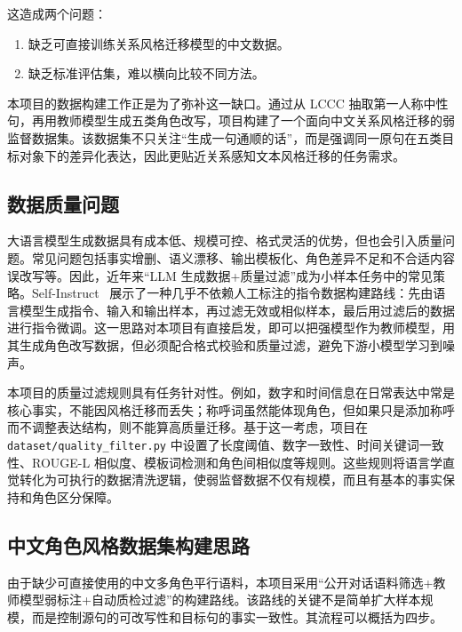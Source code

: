 \documentclass[12pt,a4paper]{ctexart}
\begin{document}
这造成两个问题：

\begin{enumerate}[leftmargin=2em]
  \item 缺乏可直接训练关系风格迁移模型的中文数据。
  \item 缺乏标准评估集，难以横向比较不同方法。
\end{enumerate}

本项目的数据构建工作正是为了弥补这一缺口。通过从 LCCC 抽取第一人称中性句，再用教师模型生成五类角色改写，项目构建了一个面向中文关系风格迁移的弱监督数据集。该数据集不只关注“生成一句通顺的话”，而是强调同一原句在五类目标对象下的差异化表达，因此更贴近关系感知文本风格迁移的任务需求。

\subsection{数据质量问题}

大语言模型生成数据具有成本低、规模可控、格式灵活的优势，但也会引入质量问题。常见问题包括事实增删、语义漂移、输出模板化、角色差异不足和不合适内容误改写等。因此，近年来“LLM 生成数据+质量过滤”成为小样本任务中的常见策略。Self-Instruct~\cite{wang2023selfinstruct} 展示了一种几乎不依赖人工标注的指令数据构建路线：先由语言模型生成指令、输入和输出样本，再过滤无效或相似样本，最后用过滤后的数据进行指令微调。这一思路对本项目有直接启发，即可以把强模型作为教师模型，用其生成角色改写数据，但必须配合格式校验和质量过滤，避免下游小模型学习到噪声。

本项目的质量过滤规则具有任务针对性。例如，数字和时间信息在日常表达中常是核心事实，不能因风格迁移而丢失；称呼词虽然能体现角色，但如果只是添加称呼而不调整表达结构，则不能算高质量迁移。基于这一考虑，项目在 \texttt{dataset/quality\_filter.py} 中设置了长度阈值、数字一致性、时间关键词一致性、ROUGE-L 相似度、模板词检测和角色间相似度等规则。这些规则将语言学直觉转化为可执行的数据清洗逻辑，使弱监督数据不仅有规模，而且有基本的事实保持和角色区分保障。

\subsection{中文角色风格数据集构建思路}

由于缺少可直接使用的中文多角色平行语料，本项目采用“公开对话语料筛选+教师模型弱标注+自动质检过滤”的构建路线。该路线的关键不是简单扩大样本规模，而是控制源句的可改写性和目标句的事实一致性。其流程可以概括为四步。
\end{document}
